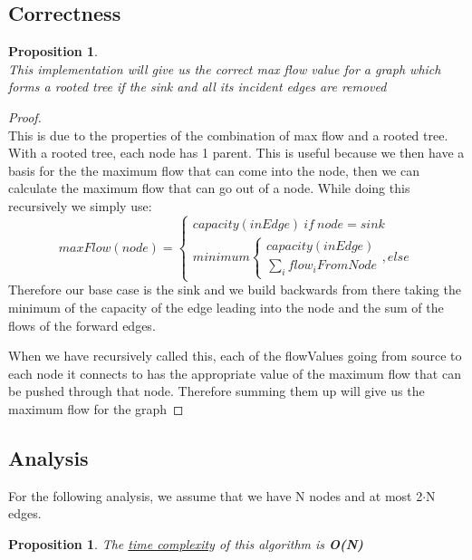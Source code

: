 \documentclass[12pt]{article}
\newtheorem{proposition}[theorem]{Proposition}
\begin{document}
\newpage
\subsection{Correctness}
\begin{proposition}
~ \\ \indent This implementation will give us the correct max flow value for a graph which forms
a rooted tree if the sink and all its incident edges are removed
\end{proposition}

\begin{proof}
~ \\ \indent This is due to the properties of the combination of max flow and a rooted tree. With a rooted
tree, each node has 1 parent. This is useful because we then have a basis for the the maximum flow that
can come into the node, then we can calculate the maximum flow that can go out of a node. While doing this
recursively we simply use:
\[ maxFlow(node) =
\begin{cases}
    capacity(inEdge)\ if\ node = sink \\
    minimum
    \begin{cases}
        capacity(inEdge) \\
        \sum_i flow_iFromNode
    \end{cases}
    , else
\end{cases}
\]
Therefore our base case is the sink and we build backwards from there taking the minimum of the capacity
of the edge leading into the node and the sum of the flows of the forward edges.

When we have recursively called this, each of the flowValues going from source to each node it connects to
has the appropriate value of the maximum flow that can be pushed through that node. Therefore summing them
up will give us the maximum flow for the graph
\end{proof}


\subsection{Analysis}
For the following analysis, we assume that we have N nodes and at most 2$\cdot$N edges.

\begin{proposition}
\label{numq}
The \underline{time complexity} of this algorithm is \textbf{O(N)}
\end{proposition}
\end{document}
